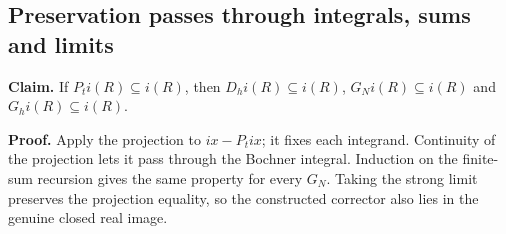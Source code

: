 \documentclass[11pt,a4paper]{report}
\begin{document}
\subsection{\texorpdfstring{Preservation passes through integrals, sums and limits}{Preservation passes through integrals, sums and limits}}
\label{report-step-WassersteinMixing-ComplexRealCorrector-lean-2}


\textbf{Claim.} If \(P_ti(R)\subseteq i(R)\), then \(D_hi(R)\subseteq i(R)\), \(G_Ni(R)\subseteq i(R)\) and \(G_hi(R)\subseteq i(R)\).



\textbf{Proof.} Apply the projection to \(ix-P_tix\); it fixes each integrand. Continuity of the projection lets it pass through the Bochner integral. Induction on the finite-sum recursion gives the same property for every \(G_N\). Taking the strong limit preserves the projection equality, so the constructed corrector also lies in the genuine closed real image.
\end{document}

